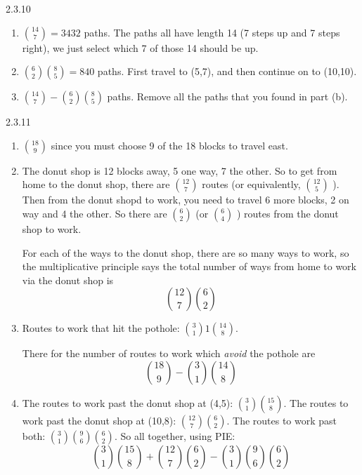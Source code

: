 \documentclass[11pt,]{book}
\theoremstyle{ptxplainnotitle}
\theoremstyle{ptxplaintitle}
\theoremstyle{ptxdefinitionnotitle}
\theoremstyle{ptxdefinitiontitle}
\theoremstyle{ptxdefinitionnotitle}
\theoremstyle{ptxdefinitiontitle}
\theoremstyle{ptxdefinitionnotitle}
\theoremstyle{ptxdefinitiontitle}
\theoremstyle{ptxdefinitiontitlenonumber}
\theoremstyle{ptxdefinitiontitlenonumber}
\numberwithin{equation}{chapter}
\begin{document}
\begin{divisionexercise}{2.3.10}
\textbf{}\hypertarget{p-1408}{}%
\leavevmode%
\begin{enumerate}[label=(\alph*)]
\item\hypertarget{li-610}{}\hypertarget{p-1409}{}%
\({14 \choose 7} = 3432\) paths.  The paths all have length 14 (7 steps up and 7 steps right), we just select which 7 of those 14 should be up.%
\item\hypertarget{li-611}{}\hypertarget{p-1410}{}%
\({6 \choose 2}{8\choose 5} = 840\) paths.  First travel to (5,7), and then continue on to (10,10).%
\item\hypertarget{li-612}{}\hypertarget{p-1411}{}%
\({14 \choose 7} - {6\choose 2}{8 \choose 5}\) paths.  Remove all the paths that you found in part (b).%
\end{enumerate}
%
\end{divisionexercise}%
\begin{divisionexercise}{2.3.11}
\textbf{}\hypertarget{p-1418}{}%
\leavevmode%
\begin{enumerate}[label=(\alph*)]
\item\hypertarget{li-617}{}\hypertarget{p-1419}{}%
\({18 \choose 9}\) since you must choose 9 of the 18 blocks to travel east.%
\item\hypertarget{li-618}{}\hypertarget{p-1420}{}%
The donut shop is 12 blocks away, 5 one way, 7 the other.  So to get from home to the donut shop, there are \({12 \choose 7}\) routes (or equivalently, \({12 \choose 5}\) ).  Then from the donut shopd to work, you need to travel 6 more blocks, 2 on way and 4 the other.  So there are \({6 \choose 2}\) (or \({6 \choose 4}\) ) routes from the donut shop to work.%
\par
\hypertarget{p-1421}{}%
For each of the ways to the donut shop, there are so many ways to work, so the multiplicative principle says the total number of ways from home to work via the donut shop is%
\begin{equation*}
{12 \choose 7}{6 \choose 2}
\end{equation*}
%
\item\hypertarget{li-619}{}\hypertarget{p-1422}{}%
Routes to work that hit the pothole: \({3 \choose 1}1{14 \choose 8}\).%
\par
\hypertarget{p-1423}{}%
There for the number of routes to work which {\em avoid} the pothole are%
\begin{equation*}
{18 \choose 9} - {3 \choose 1}{14 \choose 8}
\end{equation*}
%
\item\hypertarget{li-620}{}\hypertarget{p-1424}{}%
The routes to work past the donut shop at (4,5): \({3\choose 1}{15 \choose 8}\).  The routes to work past the donut shop at (10,8): \({12 \choose 7}{6 \choose 2}\).  The routes to work past both: \({3\choose 1}{9 \choose 6}{6 \choose 2}\).  So all together, using PIE:%
\begin{equation*}
{3\choose 1}{15 \choose 8} + {12 \choose 7}{6 \choose 2} - {3\choose 1}{9 \choose 6}{6 \choose 2}
\end{equation*}
%
\end{enumerate}
%
\end{divisionexercise}%
\end{document}

